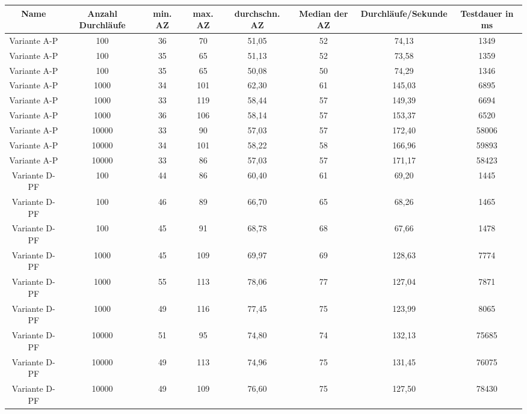 \begin{landscape}
	\begin{table}[h!]
		\centering
		\small
		\begin{tabular}{ |c|c|c|c|c|c|c|c|} 
			\hline
			Name & Anzahl Durchläufe & min. AZ & max. AZ & durchschn. AZ & Median der AZ & Durchläufe/Sekunde & Testdauer in ms \\ 
			\hline
			Variante A-P & 100 & 36 & 70 & 51,05 & 52 & 74,13 & 1349 \\ 
			\hline
			Variante A-P & 100 & 35 & 65 & 51,13 & 52 & 73,58 & 1359 \\ 
			\hline
			Variante A-P & 100 & 35 & 65 & 50,08 & 50 & 74,29 & 1346 \\ 
			\hline
			
			Variante A-P & 1000 & 34 & 101 & 62,30 & 61 & 145,03 & 6895 \\ 
			\hline
			Variante A-P & 1000 & 33 & 119 & 58,44 & 57 & 149,39 & 6694 \\ 
			\hline
			Variante A-P & 1000 & 36 & 106 & 58,14 & 57 & 153,37 & 6520 \\ 
			\hline
			
			Variante A-P & 10000 & 33 & 90 & 57,03 & 57 & 172,40 & 58006 \\ 
			\hline
			Variante A-P & 10000 & 34 & 101 & 58,22 & 58 & 166,96 & 59893 \\ 
			\hline
			Variante A-P & 10000 & 33 & 86 & 57,03 & 57 & 171,17 & 58423 \\ 
			\hline
			
			Variante D-PF & 100 & 44 & 86 & 60,40 & 61 & 69,20 & 1445 \\ 
			\hline
			Variante D-PF & 100 & 46 & 89 & 66,70 & 65 & 68,26 & 1465 \\ 
			\hline
			Variante D-PF & 100 & 45 & 91 & 68,78 & 68 & 67,66 & 1478 \\ 
			\hline
			
			Variante D-PF & 1000 & 45 & 109 & 69,97 & 69 & 128,63 & 7774 \\ 
			\hline
			Variante D-PF & 1000 & 55 & 113 & 78,06 & 77 & 127,04 & 7871 \\ 
			\hline
			Variante D-PF & 1000 & 49 & 116 & 77,45 & 75 & 123,99 & 8065 \\ 
			\hline
			
			Variante D-PF & 10000 & 51 & 95 & 74,80 & 74 & 132,13 & 75685 \\ 
			\hline
			Variante D-PF & 10000 & 49 & 113 & 74,96 & 75 & 131,45 & 76075 \\ 
			\hline
			Variante D-PF & 10000 & 49 & 109 & 76,60 & 75 & 127,50 & 78430 \\ 
			\hline
			

\end{tabular}
\end{table}
\end{landscape}

